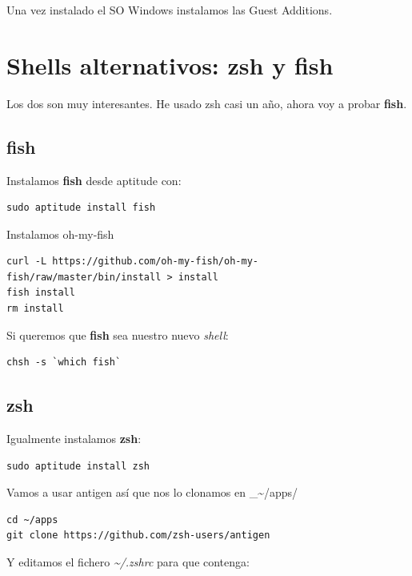 \documentclass[12pt,spanish,]{scrartcl}
\begin{document}
Una vez instalado el SO Windows instalamos las Guest Additions.

\hypertarget{shells-alternativos-zsh-y-fish}{%
\section{Shells alternativos: zsh y
fish}\label{shells-alternativos-zsh-y-fish}}

Los dos son muy interesantes. He usado zsh casi un año, ahora voy a
probar \textbf{fish}.

\hypertarget{fish}{%
\subsection{fish}\label{fish}}

Instalamos \textbf{fish} desde aptitude con:

\begin{verbatim}
sudo aptitude install fish
\end{verbatim}

Instalamos oh-my-fish

\begin{verbatim}
curl -L https://github.com/oh-my-fish/oh-my-fish/raw/master/bin/install > install
fish install
rm install
\end{verbatim}

Si queremos que \textbf{fish} sea nuestro nuevo \emph{shell}:

\begin{verbatim}
chsh -s `which fish`
\end{verbatim}

\hypertarget{zsh}{%
\subsection{zsh}\label{zsh}}

Igualmente instalamos \textbf{zsh}:

\begin{verbatim}
sudo aptitude install zsh
\end{verbatim}

Vamos a usar antigen así que nos lo clonamos en
\_\textasciitilde{}/apps/

\begin{verbatim}
cd ~/apps
git clone https://github.com/zsh-users/antigen
\end{verbatim}

Y editamos el fichero \emph{\textasciitilde{}/.zshrc} para que contenga:
\end{document}
